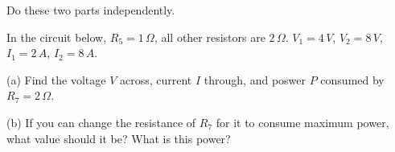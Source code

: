 \begin{enumerate}
  Do these two parts independently.

  \begin{comment}
  {\bf Solution:} 
  First find the equivalent resistance used in both models:
  \[
  R_T=R_N=2+1||(8+3)＝2+\frac{11}{12}=\frac{35}{12}
  \]
  \begin{itemize}
  \item Thevenin's model: 

    Use superposition to find $V_T=V_{oc}$:
    Due to voltage source alone
    \[
    V_T'=1V\frac{3+8}{3+8+1}=\frac{11}{12}
    \]
    Due to current source alone, current through $R_1$ and $R_3$ is
    $3A\times 8/(8+3+1) =2A$, current through $R_4$ is
    $3A\times (1+3)/(8+3+1) =1A$, voltega drop across $R_2$ is
    $-3\times 2=-6V$, voltage drop across $R_1$ is $-2V$, therefore
    $V''_T=-8V$, and
    \[
    V_T=V'_T+V''_T=\frac{11}{12}-8=-\frac{85}{12}
    \]
  \item Nordon's model:

    Use superposition to find $I_T=I_{sc}$:
    Due to voltage source slone
    \[
    I'_N=\frac{V}{1+2||(3+8)}\times\frac{8+3}{2+8+3}=\frac{11}{35}
    \]
    Due to current source slone:
    Convert the triangle formed by the three resistors on top
    (of $1\Omega$, $3\Omega$, and $8 \Omega$) to a Y with
    $R_a=2/3$ (top-left), $R_b=1/4$ (top-right), $R_c=2$ (bottom),
    then find current through short circuit on the right by current
    divider as
    \[
    I''_N=-3A\frac{2+2/3}{2+2/3+1/4}=-\frac{96}{35}
    \]
    The total current is
    \[
    I_N=I'_N-I''_N=\frac{11}{35}-\frac{96}{35}=-\frac{17}{7}
    \]
  \end{itemize}

  The Nordon's model can be converted to Thevenin's model
  \[
  I_N\times R_N=-\frac{17}{7}\times\frac{35}{12}=-\frac{85}{12}
  \]
  \end{comment}


\end{enumerate}



  In the circuit below, $R_5=1\,\Omega$, all other resistors are
  $2\,\Omega$. $V_1=4\,V$, $V_2=8\,V$, $I_1=2\,A$, $I_2=8\,A$.

  (a) Find the voltage $V$ across, current $I$ through, and poswer
  $P$ consumed by $R_7=2\,\Omega$.
  

  (b) If you can change the resistance of $R_7$ for it to consume
  maximum power, what value should it be? What is this power?



